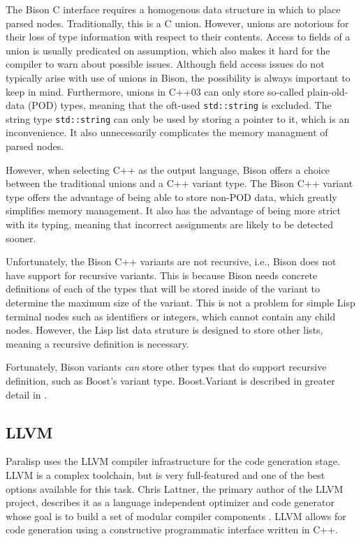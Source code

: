 \documentclass[abstracton]{scrartcl}
\begin{document}
The Bison C interface requires a homogenous data structure in which to place parsed nodes. Traditionally, this is a C union. However, unions are notorious for their loss of type information with respect to their contents. Access to fields of a union is usually predicated on assumption, which also makes it hard for the compiler to warn about possible issues. Although field access issues do not typically arise with use of unions in Bison, the possibility is always important to keep in mind. Furthermore, unions in C++03 can only store so-called plain-old-data (POD) types, meaning that the oft-used \verb|std::string| is excluded. The string type \verb|std::string| can only be used by storing a pointer to it, which is an inconvenience. It also unnecessarily complicates the memory managment of parsed nodes.

However, when selecting C++ as the output language, Bison offers a choice between the traditional unions and a C++ variant type. The Bison C++ variant type offers the advantage of being able to store non-POD data, which greatly simplifies memory management. It also has the advantage of being more strict with its typing, meaning that incorrect assignments are likely to be detected sooner.

Unfortunately, the Bison C++ variants are not recursive, i.e., Bison does not have support for recursive variants. This is because Bison needs concrete definitions of each of the types that will be stored inside of the variant to determine the maximum size of the variant. This is not a problem for simple Lisp terminal nodes such as identifiers or integers, which cannot contain any child nodes. However, the Lisp list data struture is designed to store other lists, meaning a recursive definition is necessary.

Fortunately, Bison variants \emph{can} store other types that do support recursive definition, such as Boost's variant type. Boost.Variant is described in greater detail in .

\subsection{LLVM}

Paralisp uses the LLVM compiler infrastructure for the code generation stage. LLVM is a complex toolchain, but is very full-featured and one of the best options available for this task. Chris Lattner, the primary author of the LLVM project, describes it as a language independent optimizer and code generator whose goal is to build a set of modular compiler components \autocite{2011-02-FOSDEM-LLVMAndClang}. LLVM allows for code generation using a constructive programmatic interface written in C++.
\end{document}
